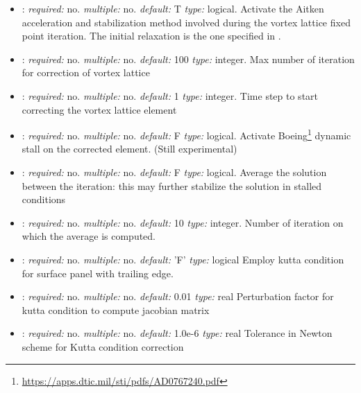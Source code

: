 \begin{itemize}
\item {}: \textit{required:} no. \textit{multiple:} no. 
\textit{default:} T \textit{type:} logical. 
Activate the Aitken acceleration and stabilization method involved during the 
vortex lattice fixed point iteration. 
The initial relaxation is the one specified in . 

\item {}: \textit{required:} no. \textit{multiple:} no. 
\textit{default:} 100 \textit{type:} integer. 
Max number of iteration for correction of vortex lattice

\item {}: \textit{required:} no. \textit{multiple:} no. 
\textit{default:} 1 \textit{type:} integer. 
Time step to start correcting the vortex lattice element

\item {}: \textit{required:} no. \textit{multiple:} no. 
\textit{default:} F \textit{type:} logical. 
Activate Boeing\footnote{\url{https://apps.dtic.mil/sti/pdfs/AD0767240.pdf}} 
dynamic stall on the corrected  element.  (Still experimental)

\item {}: \textit{required:} no. \textit{multiple:} no. 
\textit{default:} F \textit{type:} logical. 
Average the solution between the iteration: this may further stabilize the solution in stalled conditions

\item {}: \textit{required:} no. \textit{multiple:} no. 
\textit{default:} 10 \textit{type:} integer. 
Number of iteration on which the average is computed. 

\item {}: \textit{required:} no. \textit{multiple:} no. \textit{default:} 'F' \textit{type:} logical
    Employ kutta condition for surface panel with trailing edge. 

\item {}: \textit{required:} no. \textit{multiple:} no. \textit{default:} 0.01 \textit{type:} real  
    Perturbation factor for kutta condition to compute jacobian matrix 

\item {}: \textit{required:} no. \textit{multiple:} no. \textit{default:} 1.0e-6 \textit{type:} real
    Tolerance in Newton scheme for Kutta condition correction  


\end{itemize}
